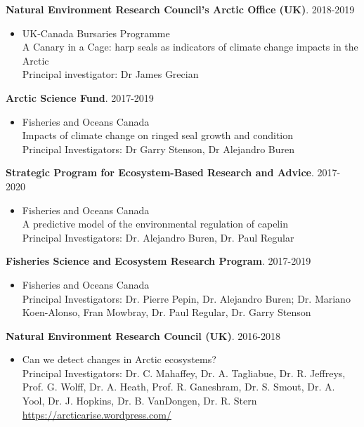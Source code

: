 \documentclass{res}
\begin{document}
\begin{resume}
{\bf Natural Environment Research Council's Arctic Office (UK)}. 2018-2019
\begin{itemize}
	\item[] UK-Canada Bursaries Programme\\
	A Canary in a Cage: harp seals as indicators of climate change impacts in the Arctic\\
	Principal investigator: Dr James Grecian
\end{itemize}
{\bf Arctic Science Fund}. 2017-2019
\begin{itemize} %
	\item[] Fisheries and Oceans Canada\\
	Impacts of climate change on ringed seal growth and condition\\
	Principal Investigators: Dr Garry Stenson, Dr Alejandro Buren
\end{itemize}
{\bf Strategic Program for Ecosystem-Based Research and Advice}. 2017-2020
\begin{itemize} %
	\item[] Fisheries and Oceans Canada\\
	A predictive model of the environmental regulation of capelin\\
	Principal Investigators: Dr. Alejandro Buren, Dr. Paul Regular
\end{itemize}

\textbf{Fisheries Science and Ecosystem Research Program}. 2017-2019
\begin{itemize} %
	\item[] Fisheries and Oceans Canada\\
Principal Investigators: Dr. Pierre Pepin, Dr. Alejandro Buren; Dr. Mariano Koen-Alonso, Fran Mowbray, Dr. Paul Regular, Dr. Garry Stenson
\end{itemize}

\textbf{Natural Environment Research Council (UK)}. 2016-2018
\begin{itemize} %
	\item[] Can we detect changes in Arctic ecosystems?\\
Principal Investigators: Dr. C. Mahaffey, Dr. A. Tagliabue, Dr. R. Jeffreys, Prof. G. Wolff, Dr. A. Heath, Prof. R. Ganeshram, Dr. S. Smout, Dr. A. Yool, Dr. J. Hopkins, Dr. B. VanDongen, Dr. R. Stern \\
\url{https://arcticarise.wordpress.com/}
\end{itemize}


\end{resume}
\end{document}
